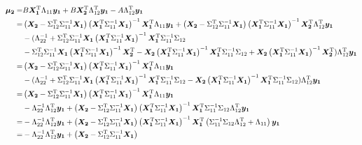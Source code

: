 \documentclass[twoside]{article}
\begin{document}
\begin{align*}
\B{\mu_2}
=&
    B
    \B{X_1}\tp\Lambda_{11}\B{y_1}
    +
    B\B{X_2}\tp\Lambda_{12}\tp\B{y_1}
    -
    A \Lambda_{12}\tp\B{y_1}
\\
=&
\left(
\B{X_2}
-
\Sigma_{12}\tp
\Sigma_{11}^{-1}
\B{X_1}
\right)
\left(\B{X_1}\tp\Sigma_{11}^{-1}\B{X_1}\right)^{-1}
    \B{X_1}\tp\Lambda_{11}\B{y_1}
+
\left(
\B{X_2}
-
\Sigma_{12}\tp
\Sigma_{11}^{-1}
\B{X_1}
\right)
\left(\B{X_1}\tp\Sigma_{11}^{-1}\B{X_1}\right)^{-1}
    \B{X_2}\tp\Lambda_{12}\tp\B{y_1}
\\&
-
(\Lambda_{22}^{-1}
+
    \Sigma_{12}\tp\Sigma_{11}^{-1} 
\B{X_1}
\left(\B{X_1}\tp\Sigma_{11}^{-1}\B{X_1}\right)^{-1}
\B{X_1}\tp
    \Sigma_{11}^{-1}\Sigma_{12} 
\\
&-
    \Sigma_{12}\tp\Sigma_{11}^{-1} 
\B{X_1}
\left(\B{X_1}\tp\Sigma_{11}^{-1}\B{X_1}\right)^{-1}
\B{X_2}\tp
-
\B{X_2}
\left(\B{X_1}\tp\Sigma_{11}^{-1}\B{X_1}\right)^{-1}
\B{X_1}\tp
    \Sigma_{11}^{-1}\Sigma_{12} 
+
\B{X_2}
\left(\B{X_1}\tp\Sigma_{11}^{-1}\B{X_1}\right)^{-1}
\B{X_2}\tp)
     \Lambda_{12}\tp\B{y_1}
\\
=&
\left(
\B{X_2}
-
\Sigma_{12}\tp
\Sigma_{11}^{-1}
\B{X_1}
\right)
\left(\B{X_1}\tp\Sigma_{11}^{-1}\B{X_1}\right)^{-1}
    \B{X_1}\tp\Lambda_{11}\B{y_1}
\\&
-
(\Lambda_{22}^{-1}
+
    \Sigma_{12}\tp\Sigma_{11}^{-1} 
\B{X_1}
\left(\B{X_1}\tp\Sigma_{11}^{-1}\B{X_1}\right)^{-1}
\B{X_1}\tp
    \Sigma_{11}^{-1}\Sigma_{12} 
-
\B{X_2}
\left(\B{X_1}\tp\Sigma_{11}^{-1}\B{X_1}\right)^{-1}
\B{X_1}\tp
    \Sigma_{11}^{-1}\Sigma_{12} 
)
     \Lambda_{12}\tp\B{y_1}
\\
=&
\left(
\B{X_2}
-
\Sigma_{12}\tp
\Sigma_{11}^{-1}
\B{X_1}
\right)
\left(\B{X_1}\tp\Sigma_{11}^{-1}\B{X_1}\right)^{-1}
    \B{X_1}\tp\Lambda_{11}\B{y_1}
\\&
-\Lambda_{22}^{-1} \Lambda_{12}\tp\B{y_1}
+\left(
   \B{X_2} -  \Sigma_{12}\tp\Sigma_{11}^{-1} 
\B{X_1}\right)
\left(\B{X_1}\tp\Sigma_{11}^{-1}\B{X_1}\right)^{-1}
\B{X_1}\tp
    \Sigma_{11}^{-1}\Sigma_{12} 
     \Lambda_{12}\tp\B{y_1}
\\
=&
-\Lambda_{22}^{-1} \Lambda_{12}\tp\B{y_1}
+\left(
   \B{X_2} -  \Sigma_{12}\tp\Sigma_{11}^{-1} 
\B{X_1}\right)
\left(\B{X_1}\tp\Sigma_{11}^{-1}\B{X_1}\right)^{-1}
\B{X_1}\tp\left(
    \Sigma_{11}^{-1}\Sigma_{12} 
     \Lambda_{12}\tp
     +
   \Lambda_{11}  
\right)
\B{y_1}
\\
=&
-\Lambda_{22}^{-1} \Lambda_{12}\tp\B{y_1}
+\left(
   \B{X_2} -  \Sigma_{12}\tp\Sigma_{11}^{-1} 
\B{X_1}\right)

\end{align*}
\end{document}
